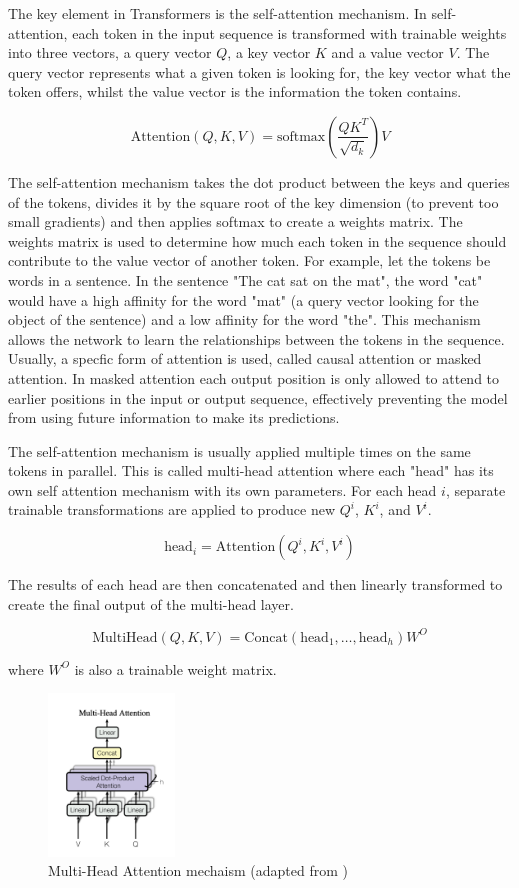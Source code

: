 \documentclass[11pt]{article}
\begin{document}
The key element in Transformers is the self-attention mechanism. In self-attention, each token in the input sequence is transformed with trainable weights into three vectors, a query vector $Q$, a key vector $K$ and a value vector $V$. The query vector represents what a given token is looking for, the key vector what the token offers, whilst the value vector is the information the token contains.

$$\text{Attention}(Q, K , V) = \text{softmax}\left(\frac{QK^T}{\sqrt{d_k}}\right)V$$

The self-attention mechanism takes the dot product between the keys and queries of the tokens, divides it by the square root of the key dimension (to prevent too small gradients) and then applies softmax to create a weights matrix. The weights matrix is used to determine how much each token in the sequence should contribute to the value vector of another token. For example, let the tokens be words in a sentence. In the sentence "The cat sat on the mat", the word "cat" would have a high affinity for the word "mat" (a query vector looking for the object of the sentence) and a low affinity for the word "the". This mechanism allows the network to learn the relationships between the tokens in the sequence. Usually, a specfic form of attention is used, called causal attention or masked attention. In masked attention each output position is only allowed to attend to earlier positions in the input or output sequence, effectively preventing the model from using future information to make its predictions.

The self-attention mechanism is usually applied multiple times on the same tokens in parallel. This is called multi-head attention where each "head" has its own self attention mechanism with its own parameters. For each head $i$, separate trainable transformations are applied to produce new $Q^i$, $K^i$, and $V^i$.

$$\text{head}_i = \text{Attention}(Q^i, K^i, V^i)$$

The results of each head are then concatenated and then linearly transformed to create the final output of the multi-head layer.

$$\text{MultiHead}(Q, K, V) = \text{Concat}(\text{head}_1, \ldots, \text{head}_h)W^O$$

where $W^O$ is also a trainable weight matrix.

\begin{figure}[h]
\centering
\includegraphics[width=0.3\textwidth]{multi-head.png}
\caption{Multi-Head Attention mechaism (adapted from \cite{DBLP:journals/corr/VaswaniSPUJGKP17})}
\end{figure}
\end{document}
